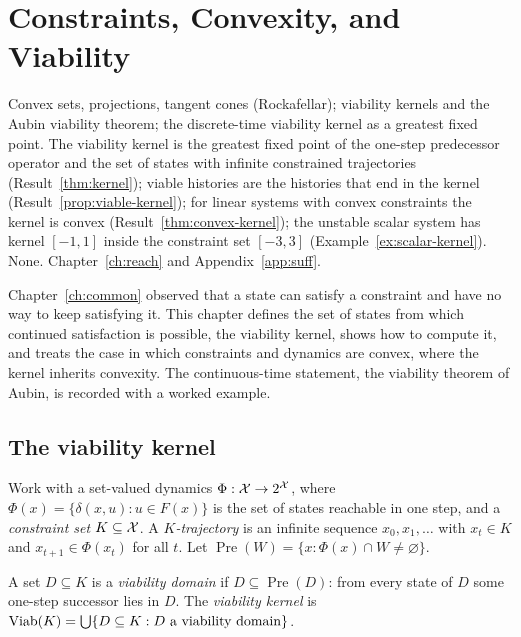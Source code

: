\chapter{Constraints, Convexity, and Viability}\label{ch:viability}
{Convex sets, projections, tangent cones (Rockafellar); viability kernels and the Aubin viability theorem; the discrete-time viability kernel as a greatest fixed point.}
{The viability kernel is the greatest fixed point of the one-step predecessor operator and the set of states with infinite constrained trajectories (Result~\ref{thm:kernel}); viable histories are the histories that end in the kernel (Result~\ref{prop:viable-kernel}); for linear systems with convex constraints the kernel is convex (Result~\ref{thm:convex-kernel}); the unstable scalar system has kernel $[-1,1]$ inside the constraint set $[-3,3]$ (Example~\ref{ex:scalar-kernel}).}
{None.}
{Chapter~\ref{ch:reach} and Appendix~\ref{app:suff}.}

Chapter~\ref{ch:common} observed that a state can satisfy a constraint and have no way to keep satisfying it. This chapter defines the set of states from which continued satisfaction is possible, the viability kernel, shows how to compute it, and treats the case in which constraints and dynamics are convex, where the kernel inherits convexity. The continuous-time statement, the viability theorem of Aubin, is recorded with a worked example.

\section{The viability kernel}

Work with a set-valued dynamics $\Phi:\mathcal{X}\to2^{\mathcal{X}}$, where $\Phi(x)=\{\delta(x,u):u\in F(x)\}$ is the set of states reachable in one step, and a \emph{constraint set} $K\subseteq\mathcal{X}$. A \emph{$K$-trajectory} is an infinite sequence $x_0,x_1,\dots$ with $x_t\in K$ and $x_{t+1}\in\Phi(x_t)$ for all $t$. Let $\operatorname{Pre}(W)=\{x:\Phi(x)\cap W\ne\varnothing\}$.

\begin{definition}\label{def:viability}
A set $D\subseteq K$ is a \emph{viability domain} if $D\subseteq\operatorname{Pre}(D)$: from every state of $D$ some one-step successor lies in $D$. The \emph{viability kernel} is $\operatorname{Viab}(K)=\bigcup\{D\subseteq K: D\text{ a viability domain}\}$.
\end{definition}

